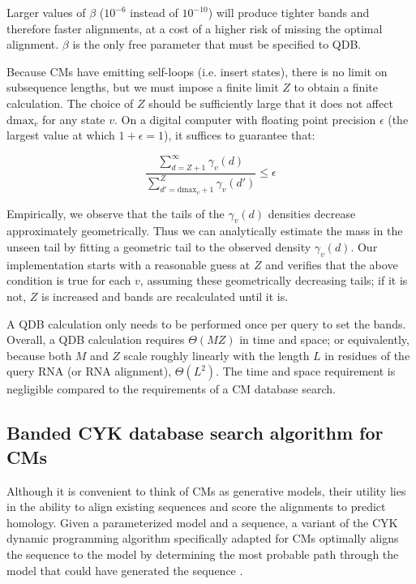 \documentclass[11pt]{article}
\begin{document}
Larger values of $\beta$ ($10^{-6}$ instead of $10^{-10}$) will
produce tighter bands and therefore faster alignments, at a cost of a
higher risk of missing the optimal alignment. $\beta$ is the only free
parameter that must be specified to QDB.

Because CMs have emitting self-loops (i.e. insert states), there is no
limit on subsequence lengths, but we must impose a finite limit $Z$ to
obtain a finite calculation.  The choice of $Z$ should be sufficiently
large that it does not affect $\mbox{dmax}_v$ for any state $v$.  On a
digital computer with floating point precision $\epsilon$ (the largest
value at which $1+\epsilon = 1$), it suffices to guarantee that:

\[
  \frac{ \sum_{d = Z+1}^{\infty}  \gamma_v(d)}
       { \sum_{d' = \mbox{dmax}_v + 1}^{Z} \gamma_v(d')}  \leq \epsilon
\]

Empirically, we observe that the tails of the $\gamma_v(d)$ densities
decrease approximately geometrically. Thus we can analytically
estimate the mass in the unseen tail by fitting a geometric tail to
the observed density $\gamma_v(d)$. Our implementation starts with a
reasonable guess at $Z$ and verifies that the above condition is true
for each $v$, assuming these geometrically decreasing tails; if it is
not, $Z$ is increased and bands are recalculated until it is.

A QDB calculation only needs to be performed once per query to set the
bands. Overall, a QDB calculation requires $\Theta(MZ)$ in time and
space; or equivalently, because both $M$ and $Z$ scale roughly
linearly with the length $L$ in residues of the query RNA (or RNA
alignment), $\Theta(L^2)$. The time and space requirement is
negligible compared to the requirements of a CM database search.

\subsection{Banded CYK database search algorithm for CMs}

Although it is convenient to think of CMs as generative models, their
utility lies in the ability to align existing sequences and score the
alignments to predict homology. Given a parameterized model and a
sequence, a variant of the CYK dynamic programming algorithm
specifically adapted for CMs optimally aligns the sequence to the
model by determining the most probable path through the model that
could have generated the sequence \cite{Durbin98}.
\end{document}
